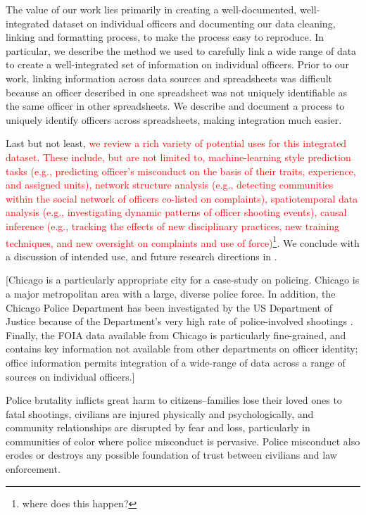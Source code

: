 The value of our work lies primarily in creating a well-documented,
well-integrated dataset on individual officers and documenting our data
cleaning, linking and formatting process, to make the process easy to
reproduce. In particular, we describe the method we used to carefully link
a wide range of data to create a well-integrated set of information on
individual officers. Prior to our work, linking information across data sources
and spreadsheets was difficult because an officer described in one spreadsheet
was not uniquely identifiable as the same officer in other spreadsheets. We
describe and document a process to uniquely identify officers across
spreadsheets, making integration much easier.

Last but not least, \textcolor{red}{we review a rich variety of potential uses for this
integrated dataset. These include, but are not limited to, machine-learning
style prediction tasks (e.g., predicting officer's misconduct on the basis of
their traits, experience, and assigned units), network structure analysis
(e.g., detecting communities within the social network of officers co-listed on
complaints), spatiotemporal data analysis (e.g., investigating dynamic patterns
of officer shooting events), causal inference (e.g., tracking the effects of
new disciplinary practices, new training techniques, and new oversight on
complaints and use of force)}\footnote{where does this happen?}. We conclude with a discussion of intended use,
and future research directions in .

[Chicago is a particularly appropriate city for a case-study on policing.
Chicago is a major metropolitan area with a large, diverse police force. In
addition, the Chicago Police Department has been investigated by the US
Department of Justice because of the Department’s very high rate of
police-involved shootings \cite{DoJ17}. Finally, the FOIA data available from Chicago is
particularly fine-grained, and contains key information not available from
other departments on officer identity; office information permits integration
of a wide-range of data across a range of sources on individual officers.]

\iffalse
Police brutality inflicts great harm to citizens--families lose their loved
ones to fatal shootings, civilians are injured physically and psychologically,
and community relationships are disrupted by fear and loss, particularly in
communities of color where police misconduct is pervasive. Police misconduct
also erodes or destroys any possible foundation of trust between civilians and
law enforcement. 

